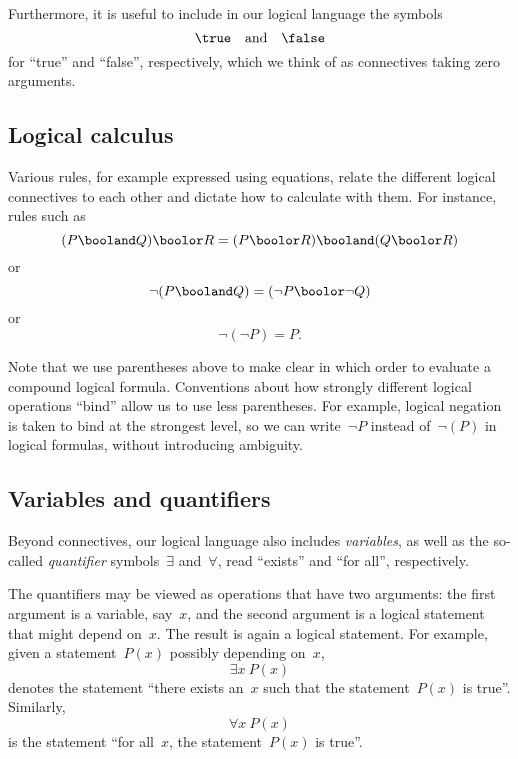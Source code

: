 Furthermore, it is useful to include in our logical language the symbols
\begin{equation}
    \true \quad \text{and}  \quad \false
\end{equation}
for ``true'' and ``false'', respectively, which we think of as connectives taking zero arguments.

\subsection{Logical calculus}

Various rules, for example expressed using equations, relate the different logical connectives to each other and dictate how to calculate with them.
For instance, rules such as
\begin{equation*}
    (P \booland Q)
    \boolor R = (P \boolor R) \booland (Q \boolor R)
\end{equation*}
or
\begin{equation*}
    \lnot (P \booland Q)  = (\lnot P \boolor \lnot Q)
\end{equation*}
or
\begin{equation*}
    \lnot (\lnot P) = P.
\end{equation*}

Note that we use parentheses above to make clear in which order to evaluate a compound logical formula.
Conventions about how strongly different logical operations ``bind'' allow us to use less parentheses.
For example, logical negation is taken to bind at the strongest level, so we can write~$\lnot P$ instead of~$\lnot (P)$ in logical formulas, without introducing ambiguity.

\subsection{Variables and quantifiers}

Beyond connectives, our logical language also includes \emph{variables}, as well as the so-called \emph{quantifier} symbols~$\exists$ and~$\forall$, read ``exists'' and ``for all'', respectively.

The quantifiers may be viewed as operations that have two arguments:
the first argument is a variable, say~$x$, and the second argument is a logical statement that might depend on~$x$.
The result is again a logical statement.
For example, given a statement~$P(x)$ possibly depending on~$x$,
\begin{equation*}
    \exists x \ P(x)
\end{equation*}
denotes the statement ``there exists an~$x$ such that the statement~$P(x)$ is true''.
Similarly,
\begin{equation*}
    \forall x \ P(x)
\end{equation*}
is the statement ``for all~$x$, the statement~$P(x)$ is true''.

